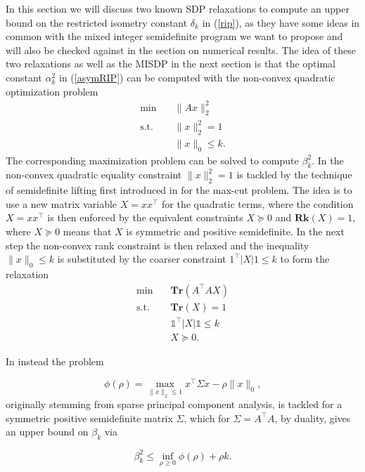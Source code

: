 \documentclass[a4paper,11pt,1p]{elsarticle}
\newcommand{\Norm}[2]{\lVert{#1}\rVert_{#2}}
\newcommand{\T}{^{\top}}
\newcommand{\Tr}{\textbf{Tr}}
\newcommand{\Rk}{\textbf{Rk}}
\newcommand{\ones}{\mathds{1}}
\begin{document}
In this section we will discuss two known SDP relaxations to compute an upper bound on the restricted isometry constant $\delta_k$ in (\ref{rip}), as they have some ideas in common with the mixed integer semidefinite program we want to 
propose and will also be checked against in the section on numerical results. The idea of these two relaxations as well as the MISDP in the next section is that the optimal constant $\alpha_k^2$ in (\ref{asymRIP}) can be computed
with the non-convex quadratic optimization problem
\begin{align}\label{QP}
 \min \quad & \Norm{Ax}{2}^2 \nonumber \\
 \text{s.t.} \quad & \Norm{x}{2}^2 = 1 \tag{QP} \\
 & \Norm{x}{0} \leq k. \nonumber
\end{align}
The corresponding maximization problem can be solved to compute $\beta_k^2$. In \cite{Asp07} the non-convex quadratic equality constraint $\Norm{x}{2}^2 = 1$ is tackled by the technique of semidefinite lifting first introduced in \cite{GW95} 
for the max-cut problem. The idea is to use a new matrix variable $X=xx\T$ for the quadratic terms, where the condition $X=xx\T$ is then enforced by the equivalent constraints $X \succeq 0$ and $\Rk(X) = 1$, where 
$X \succeq 0$ means that $X$ is symmetric and positive semidefinite. In the next step the non-convex rank constraint is then relaxed and the inequality $\Norm{x}{0} \leq k$ is substituted by the coarser constraint $1\T|X|1 \leq k$ to form
the relaxation
\begin{align}\label{Asp07}
 \min \quad & \Tr(A\T A X) \nonumber \\
 \text{s.t.} \quad & \Tr(X) = 1 \nonumber \\
 & \ones\T|X|\ones \leq k \tag{A1} \\
 & X \succeq 0. \nonumber
\end{align}

In \cite{Asp08} instead the problem

\begin{equation}\label{phi}
 \phi(\rho) = \max_{\Norm{x}{2} \leq 1} x\T \Sigma x - \rho \Norm{x}{0},
\end{equation}
originally stemming from sparse principal component analysis, is tackled for a symmetric positive semidefinite matrix $\Sigma$, which for
$\Sigma = A\T A$, by duality, gives an upper bound on $\beta_k$ via 

\begin{equation*}
 \beta_k^2 \leq \inf_{\rho \geq 0} \phi(\rho) + \rho k.
\end{equation*}
\end{document}
